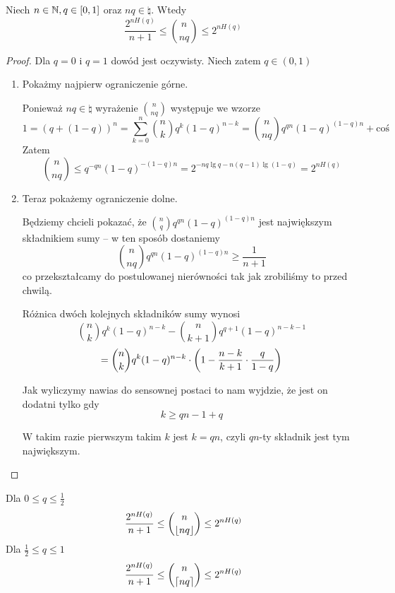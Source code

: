 \begin{theorem}[Lemat 10.2 P\&C]
	\label{entropy-binomial-coefficients-base}
	Niech \( n \in \mathbb{N}, q \in \left[0, 1\right] \) oraz \( nq \in \natural \). Wtedy
	\[
		\frac{2^{nH(q)}}{n + 1} \leq \binom{n}{nq} \leq 2^{nH(q)}
	\]
\end{theorem}
\begin{proof}
	Dla \( q = 0 \) i \( q = 1 \) dowód jest oczywisty. Niech zatem \( q \in (0, 1) \)
	\begin{enumerate}
		\item Pokażmy najpierw ograniczenie górne.

		      Ponieważ \( nq \in \natural \) wyrażenie \( \binom{n}{nq} \) występuje we wzorze
		      \[
			      1 = (q + (1-q))^n = \sum_{k=0}^n \binom{n}{k} q^k(1-q)^{n-k} = \binom{n}{nq}
			      q^{qn}(1-q)^{(1-q)n} + \text{coś}
		      \]
		      Zatem
		      \[
			      \binom{n}{nq} \leq q^{-qn}(1-q)^{-(1-q)n} = 2^{-nq\lg q - n(q-1)\lg(1-q)} = 2^{nH(q)}
		      \]

		\item Teraz pokażemy ograniczenie dolne.

		      Będziemy chcieli pokazać, że \( \binom{n}{q}q^{qn}(1-q)^{(1-q)n} \)
		      jest największym składnikiem sumy -- w ten sposób dostaniemy
		      \[
			      \binom{n}{nq}q^{qn}(1-q)^{(1-q)n} \geq \frac{1}{n+1}
		      \]
		      co przekształcamy do postulowanej nierówności tak jak zrobiliśmy to przed chwilą.

		      Różnica dwóch kolejnych składników sumy wynosi
		      \[
			      \binom{n}{k}q^k(1-q)^{n-k} - \binom{n}{k+1}q^{q+1}(1-q)^{n-k-1}
		      \]
		      \[
			      = \binom{n}{k}q^k(1-q)^{n-k} \cdot \left(1 - \frac{n - k}{k + 1} \cdot \frac{q}{1-q}\right)
		      \]

		      Jak wyliczymy nawias do sensownej postaci to nam wyjdzie, że jest on dodatni tylko gdy
		      \[
			      k \geq qn - 1 + q
		      \]

		      W takim razie pierwszym takim \( k \) jest \( k = qn \), czyli \( qn\)-ty składnik jest tym największym.
	\end{enumerate}
\end{proof}
\begin{theorem}[Wniosek 10.3 P\&C] \( \) \\
	Dla \( 0 \leq q \leq \frac{1}{2} \)
	\[
		\frac{2^{nH(q)}}{n + 1} \leq \binom{n}{\left\lfloor nq\right\rfloor} \leq 2^{nH(q)}
	\]
	Dla \( \frac{1}{2} \leq q \leq 1 \)
	\[
		\frac{2^{nH(q)}}{n + 1} \leq \binom{n}{\left\lceil nq\right\rceil} \leq 2^{nH(q)} \\
	\]
\end{theorem}
